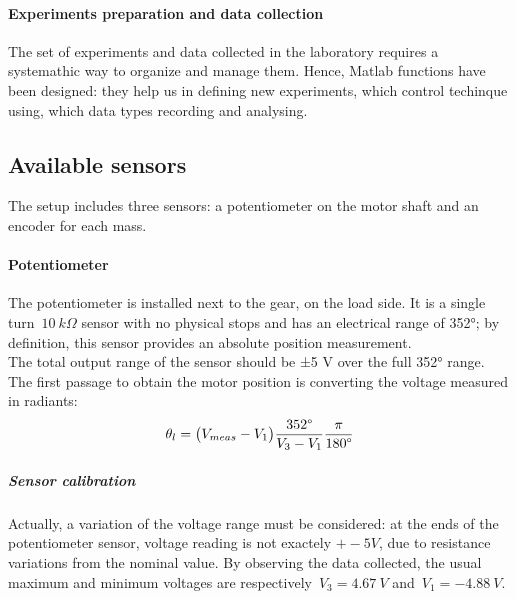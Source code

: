 
\paragraph{Experiments preparation and data collection}

The set of experiments and data collected in the laboratory requires a systemathic way to organize and manage them. Hence, Matlab functions have been designed: they help us in defining new experiments, which control techinque using, which data types recording and analysing.

\subsection{Available sensors}

The setup includes three sensors: a potentiometer on the motor shaft and an encoder for each mass.

\paragraph{Potentiometer}

The potentiometer is installed next to the gear, on the load side. It is a single turn~$10 \ k\Omega$ sensor with no physical stops and has an electrical range of 352°; by definition, this sensor provides an absolute position measurement. \\


The total output range of the sensor should be ±5 V over the full 352° range.
The first passage to obtain the motor position is converting the voltage measured in radiants:
\[
	\theta_l = \bigl{(} V_{meas} - V_1 \bigr{)} \frac{352 \degree }{V_3 - V_1} \frac{\pi}{180 \degree }
\]

\subparagraph{Sensor calibration}
Actually, a variation of the voltage range must be considered: at the ends of the potentiometer sensor, voltage reading is not exactely $+- 5V$, due to resistance variations from the nominal value. By observing the data collected, the usual maximum and minimum voltages are respectively~$V_3=4.67 \ V$ and~$V_1=-4.88 \ V$.

